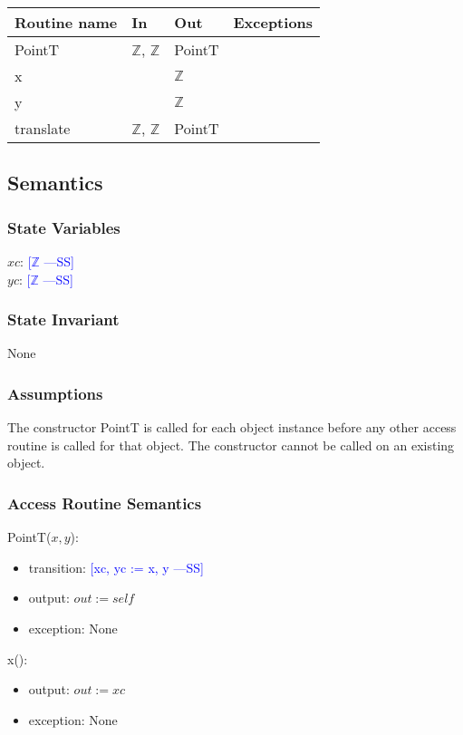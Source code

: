 \documentclass[12pt]{article}
\newcommand{\authornote}[3]{\textcolor{#1}{[#3 ---#2]}}
\newcommand{\authornote}[3]{}
\newcommand{\wss}[1]{\authornote{blue}{SS}{#1}}
\begin{document}
\begin{tabular}{| l | l | l | l |}
\hline
\textbf{Routine name} & \textbf{In} & \textbf{Out} & \textbf{Exceptions}\\
\hline
PointT & $\mathbb{Z}$, $\mathbb{Z}$ & PointT & \\
\hline
x & ~ & $\mathbb{Z}$ & ~\\
\hline
y & ~ & $\mathbb{Z}$ & ~\\
\hline
translate & $\mathbb{Z}$, $\mathbb{Z}$ & PointT & ~\\
\hline
\end{tabular}

\subsection* {Semantics}

\subsubsection* {State Variables}

$xc$: \wss{$\mathbb{Z}$}\\
$yc$: \wss{$\mathbb{Z}$}

\subsubsection* {State Invariant}

None

\subsubsection* {Assumptions}

The constructor PointT is called for each object instance before any other
access routine is called for that object.  The constructor cannot be called on
an existing object.

\subsubsection* {Access Routine Semantics}

PointT($x, y$):
\begin{itemize}
\item transition: \wss{xc, yc := x, y}
\item output: $out := \mathit{self}$
\item exception: None
\end{itemize}

\noindent x():
\begin{itemize}
\item output: $out := xc$
\item exception: None
\end{itemize}
\end{document}
